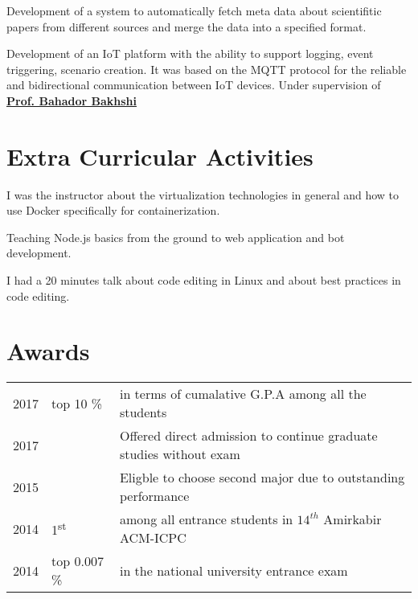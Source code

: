 \documentclass[]{deedy-resume-openfont}
\begin{document}
\begin{minipage}[t]{0.66\textwidth}
    Development of a system to automatically fetch meta data about
    scientifitic papers from different sources and merge the data into a
    specified format.
\sectionsep

    Development of an IoT platform with the ability to support logging, event
    triggering, scenario creation. It was based on the MQTT protocol
    for the reliable and bidirectional communication between IoT devices.
    Under supervision of \href{http://ceit.aut.ac.ir/~bakhshis}{\textbf{Prof. Bahador Bakhshi}}
\sectionsep

\section{Extra Curricular Activities}
I was the instructor about the virtualization technologies in general
and how to use Docker specifically for containerization.
\sectionsep

Teaching Node.js basics from the ground to web application and bot development.
\sectionsep

I had a 20 minutes talk about code editing in Linux and about
best practices in code editing.

\sectionsep

\section{Awards}
\begin{tabular}{rll}
2017	     & top 10 \% &  in terms of cumalative G.P.A among all the students \\
2017	     & &  Offered direct admission to continue graduate studies without exam\\
2015	     & &  Eligble to choose second major due to outstanding performance\\
2014	     & 1\textsuperscript{st}  & among all entrance students in $14^{th}$ Amirkabir ACM-ICPC \\
2014	     & top 0.007 \%  & in the national university entrance exam\\
\end{tabular}
\sectionsep


\end{minipage}
\end{document}

